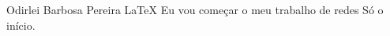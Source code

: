 \documentclass[12pt,a4paper]{book}
\begin{document}
Odirlei Barbosa Pereira
\LaTeX
Eu vou começar o meu trabalho de redes 
Só o início.
\end{document}
